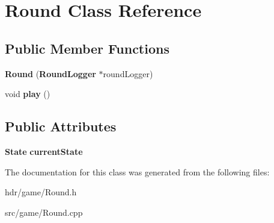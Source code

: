\section{Round Class Reference}
\label{class_round}
\subsection*{Public Member Functions}
\begin{DoxyCompactItemize}
\item 
{\bfseries Round} ({\bf Round\-Logger} $\ast$round\-Logger)\label{class_round_abbe52774d5d8aa3821fb98da60cfbb2c}

\item 
void {\bfseries play} ()\label{class_round_a5f82d0ce31d620c9e649fb5b565c79b4}

\end{DoxyCompactItemize}
\subsection*{Public Attributes}
\begin{DoxyCompactItemize}
\item 
{\bf State} {\bfseries current\-State}\label{class_round_ae453f02f4bf081afa39f79779cbb6577}

\end{DoxyCompactItemize}


The documentation for this class was generated from the following files\-:\begin{DoxyCompactItemize}
\item 
hdr/game/Round.\-h\item 
src/game/Round.\-cpp\end{DoxyCompactItemize}
